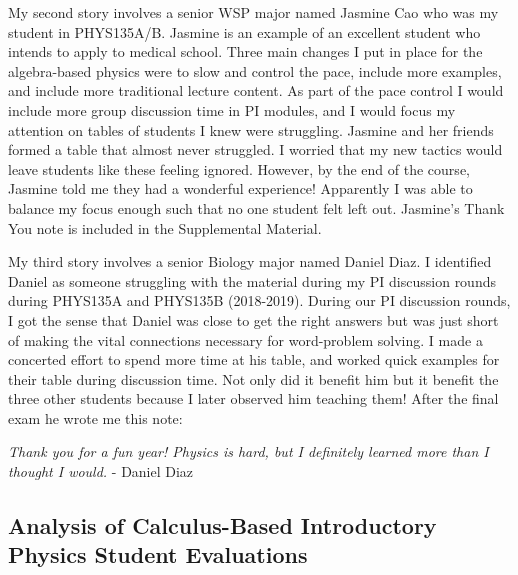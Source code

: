 \documentclass[../../main.tex]{subfiles}
\begin{document}
My second story involves a senior WSP major named Jasmine Cao who was my student in PHYS135A/B.  Jasmine is an example of an excellent student who intends to apply to medical school.  Three main changes I put in place for the algebra-based physics were to slow and control the pace, include more examples, and include more traditional lecture content.  As part of the pace control I would include more group discussion time in PI modules, and I would focus my attention on tables of students I knew were struggling.  Jasmine and her friends formed a table that almost never struggled.  I worried that my new tactics would leave students like these feeling ignored.  However, by the end of the course, Jasmine told me they had a wonderful experience!  Apparently I was able to balance my focus enough such that no one student felt left out.  Jasmine's Thank You note is included in the Supplemental Material.  \\ \hspace{0.1cm}

My third story involves a senior Biology major named Daniel Diaz.  I identified Daniel as someone struggling with the material during my PI discussion rounds during PHYS135A and PHYS135B (2018-2019).  During our PI discussion rounds, I got the sense that Daniel was close to get the right answers but was just short of making the vital connections necessary for word-problem solving.  I made a concerted effort to spend more time at his table, and worked quick examples for their table during discussion time.  Not only did it benefit him but it benefit the three other students because I later observed him teaching them!  After the final exam he wrote me this note: \\ \hspace{0.1cm}

\textit{Thank you for a fun year!  Physics is hard, but I definitely learned more than I thought I would.} - Daniel Diaz \\ \hspace{0.1cm}

\subsection{Analysis of Calculus-Based Introductory Physics Student Evaluations}
\end{document}
